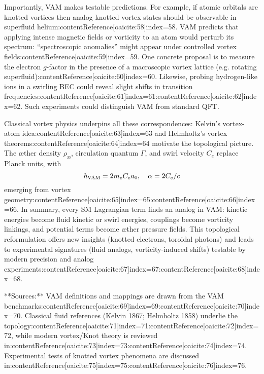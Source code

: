 \documentclass[a4paper,12pt]{article}
\begin{document}
Importantly, VAM makes testable predictions.  For example, if atomic orbitals are knotted vortices then analog knotted vortex states should be observable in superfluid helium:contentReference[oaicite:58]{index=58}.  VAM predicts that applying intense magnetic fields or vorticity to an atom would perturb its spectrum: “spectroscopic anomalies” might appear under controlled vortex fields:contentReference[oaicite:59]{index=59}.  One concrete proposal is to measure the electron $g$-factor in the presence of a macroscopic vortex lattice (e.g. rotating superfluid):contentReference[oaicite:60]{index=60}.  Likewise, probing hydrogen-like ions in a swirling BEC could reveal slight shifts in transition frequencies:contentReference[oaicite:61]{index=61}:contentReference[oaicite:62]{index=62}.  Such experiments could distinguish VAM from standard QFT.

Classical vortex physics underpins all these correspondences: Kelvin’s vortex-atom idea:contentReference[oaicite:63]{index=63} and Helmholtz’s vortex theorems:contentReference[oaicite:64]{index=64} motivate the topological picture.  The æther density $\rho_{æ}$, circulation quantum $\Gamma$, and swirl velocity $C_e$ replace Planck units, with
$$\hbar_{\rm VAM}=2m_eC_e a_0,\quad \alpha=2C_e/c$$
emerging from vortex geometry:contentReference[oaicite:65]{index=65}:contentReference[oaicite:66]{index=66}.  In summary, every SM Lagrangian term finds an analog in VAM: kinetic energies become fluid kinetic or swirl energies, couplings become vorticity linkings, and potential terms become æther pressure fields.  This topological reformulation offers new insights (knotted electrons, toroidal photons) and leads to experimental signatures (fluid analogs, vorticity-induced shifts) testable by modern precision and analog experiments:contentReference[oaicite:67]{index=67}:contentReference[oaicite:68]{index=68}.

**Sources:** VAM definitions and mappings are drawn from the VAM benchmarks:contentReference[oaicite:69]{index=69}:contentReference[oaicite:70]{index=70}.  Classical fluid references (Kelvin 1867; Helmholtz 1858) underlie the topology:contentReference[oaicite:71]{index=71}:contentReference[oaicite:72]{index=72}, while modern vortex/Knot theory is reviewed in:contentReference[oaicite:73]{index=73}:contentReference[oaicite:74]{index=74}.  Experimental tests of knotted vortex phenomena are discussed in:contentReference[oaicite:75]{index=75}:contentReference[oaicite:76]{index=76}.
\end{document}
